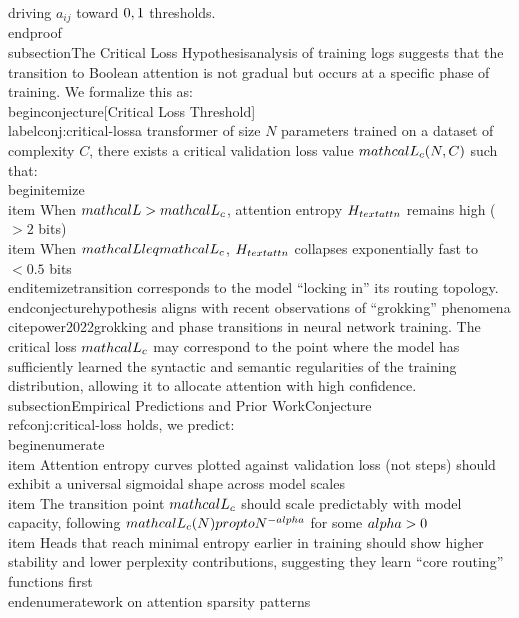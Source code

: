driving $a_{ij}$ toward $\\{0,1\\}$ thresholds.\n\\end{proof}\n\n\\subsection{The Critical Loss Hypothesis}\n\nEmpirical analysis of training logs suggests that the transition to Boolean attention is not gradual but occurs at a specific phase of training. We formalize this as:\n\n\\begin{conjecture}[Critical Loss Threshold]\n\\label{conj:critical-loss}\nFor a transformer of size $N$ parameters trained on a dataset of complexity $C$, there exists a critical validation loss value $\\mathcal{L}_c(N,C)$ such that:\n\\begin{itemize}\n\\item When $\\mathcal{L} > \\mathcal{L}_c$, attention entropy $H_{\\text{attn}}$ remains high ($> 2$ bits)\n\\item When $\\mathcal{L} \\leq \\mathcal{L}_c$, $H_{\\text{attn}}$ collapses exponentially fast to $< 0.5$ bits\n\\end{itemize}\nThis transition corresponds to the model ``locking in'' its routing topology.\n\\end{conjecture}\n\nThis hypothesis aligns with recent observations of ``grokking'' phenomena \\cite{power2022grokking} and phase transitions in neural network training. The critical loss $\\mathcal{L}_c$ may correspond to the point where the model has sufficiently learned the syntactic and semantic regularities of the training distribution, allowing it to allocate attention with high confidence.\n\n\\subsection{Empirical Predictions and Prior Work}\n\nIf Conjecture \\ref{conj:critical-loss} holds, we predict:\n\\begin{enumerate}\n\\item Attention entropy curves plotted against validation loss (not steps) should exhibit a universal sigmoidal shape across model scales\n\\item The transition point $\\mathcal{L}_c$ should scale predictably with model capacity, following $\\mathcal{L}_c(N) \\propto N^{-\\alpha}$ for some $\\alpha > 0$\n\\item Heads that reach minimal entropy earlier in training should show higher stability and lower perplexity contributions, suggesting they learn ``core routing'' functions first\n\\end{enumerate}\n\nPrior work on attention sparsity patterns 